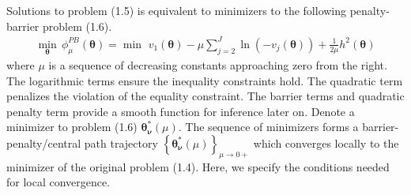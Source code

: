 \documentclass{article}
\newcommand{\bs}{ \boldsymbol}
\newcommand{\lt}{\left}
\newcommand{\rt}{\right}
\begin{document}
Solutions to problem (1.5) is equivalent to minimizers to the following penalty-barrier problem (1.6).
\begin{equation}
\begin{gathered}
\min_{\bs{\theta}} \, \phi^{PB}_{\mu}\lt(\bs{\theta}\rt) = \min \,\,v_1(\bs{\theta}) - \mu \sum_{j=2}^J \ln (-v_j\lt( \bs{\theta}\rt)) + \frac{1}{2\mu} h^2(\bs{\theta})
\end{gathered}
\end{equation}
where $\mu$ is a sequence of decreasing constants approaching zero from the right. The logarithmic terms ensure the inequality constraints hold. The quadratic term penalizes the violation of the equality constraint. The barrier terms and quadratic penalty term provide a smooth function for inference later on. Denote a minimizer to problem (1.6) $\bs{\theta}^{*}_{\bs{\nu}}(\mu)$. The sequence of minimizers forms a barrier-penalty/central path trajectory $\lt\{ \bs{\theta}_{\bs{\nu}}^*(\mu)\rt\}_{\mu \to 0+}$ which converges locally to the minimizer of the original problem (1.4). Here, we specify the conditions needed for local convergence. 
\end{document}
